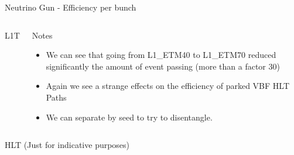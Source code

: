 \documentclass[8pt]{beamer}
\begin{document}
\begin{frame}{Neutrino Gun - Efficiency per bunch}

\begin{columns}

\begin{block}{L1T}
\centering

\resizebox{1.0\linewidth}{!}{

}

\end{block}

\begin{block}{Notes}
 
\begin{itemize}
  \item We can see that going from L1\_ETM40 to L1\_ETM70 reduced significantly the amount of event passing (more than a factor 30)
  \item Again we see a strange effects on the efficiency of parked VBF HLT Paths
  \item We can separate by seed to try to disentangle.
\end{itemize}
 
\end{block}

\end{columns}

\begin{block}{HLT (Just for indicative purposes)}
\centering
 
\resizebox{0.8\linewidth}{!}{  }

\end{block}

\end{frame}
\end{document}
